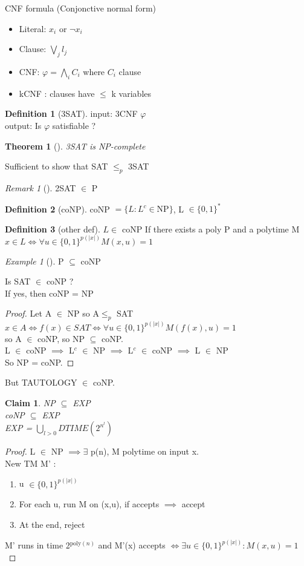 \documentclass{article}
\newtheorem{claim}{Claim}
\newtheorem{theorem}{Theorem}
\theoremstyle{definition}
\newtheorem{definition}{Definition}
\theoremstyle{remark}
\newtheorem*{remark}{Remark}
\newtheorem*{example}{Example}
\newcommand{\Thm}[3]{\begin{theorem}[#1]\label{#2}#3\end{theorem}}
\newcommand{\Ex}[3]{\begin{example}[#1]\label{#2}#3\end{example}}
\newcommand{\Def}[3]{\begin{definition}[#1]\label{#2}#3\end{definition}}
\newcommand{\Rem}[3]{\begin{remark}[#1]\label{#2}#3\end{remark}}
\newcommand{\Proof}[1]{\begin{proof}#1\end{proof}}
\begin{document}
CNF formula (Conjonctive normal form)
\begin{itemize}
	\item Literal: $x_i$ or $\neg x_i$
	\item Clause: $\bigvee\limits_{j} l_j$
	\item CNF: $\varphi = \bigwedge\limits_i C_i$ where $C_i$ clause
	\item kCNF : clauses have $\leq$ k variables
\end{itemize}

\Def{3SAT}{}{input: 3CNF $\varphi$\\
	output: Is $\varphi$ satisfiable ?}

\Thm{}{}{3SAT is NP-complete}
Sufficient to show that SAT $\leq_p$ 3SAT

\Rem{}{}{2SAT $\in$ P}

\Def{coNP}{}{coNP $= \{L:L^c \in \text{NP}\}$, L $\in \{0,1\}^*$}

\Def{other def}{}{$L \in$ coNP If there exists a poly P and a polytime M\\
	$x \in L \Longleftrightarrow \forall u\in\{0,1\}^{p(|x|)} M(x,u) = 1$}

\Ex{}{}{P $\subseteq$ coNP}

Is SAT $\in$ coNP ?\\
If yes, then coNP = NP
\Proof{Let A $\in$ NP so A$\leq_p$ SAT\\
	$x \in A \Longleftrightarrow f(x) \in SAT \Longleftrightarrow \forall u \in\{0,1\}^{p(|x|)} M(f(x),u) = 1$\\
so A $\in$ coNP,
so NP $\subseteq$ coNP.\\
L $\in$ coNP $\implies$ L$^c$ $\in$ NP $\implies$ L$^c$ $\in$ coNP $\implies$ L $\in$ NP\\
So NP = coNP.}

But TAUTOLOGY $\in$ coNP.\\

\begin{claim}
	NP $\subseteq$ EXP\\
	coNP $\subseteq$ EXP\\
	EXP = $\bigcup\limits_{l>0} DTIME(2^{n^l})$
\end{claim}
\Proof{L $\in$ NP $\implies \exists$ p(n), M polytime on input x.\\
	New TM M' :
	
	\begin{enumerate}
		\item u $\in \{0,1\}^{p(|x|)}$
		\item For each u, run M on (x,u), if accepts $\implies$ accept
		\item At the end, reject
	\end{enumerate}

	M' runs in time 2$^{\text{poly}(n)}$ and M'(x) accepts $\Longleftrightarrow \exists u \in \{0,1\}^{p(|x|)}:M(x,u) = 1$}
\end{document}
